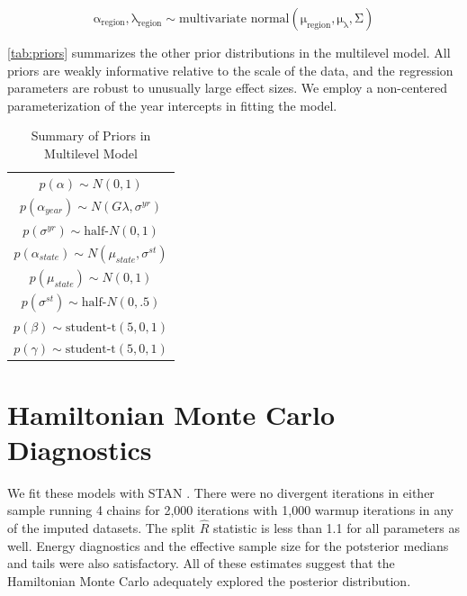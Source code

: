 \documentclass[12pt]{article}
\begin{document}
\begin{equation}
\mathrm{\alpha_{region}, \lambda_{region} \sim \mbox{multivariate normal}(\mu_{region}, \mu_{\lambda}, \Sigma)}
\end{equation}
 

\autoref{tab:priors} summarizes the other prior distributions in the multilevel model. 
All priors are weakly informative relative to the scale of the data, and the regression parameters are robust to unusually large effect sizes. 
We employ a non-centered parameterization of the year intercepts in fitting the model. 



\begin{table} %
\begin{center}
\begin{tabular}{c} 
$ p(\alpha) \sim N(0, 1)$  \\
$ p(\alpha_{year}) \sim N(G \lambda, \sigma^{yr}) $ \\ 
$ p(\sigma^{yr}) \sim \mbox{half-}N(0, 1) $ \\
$ p(\alpha_{state}) \sim N(\mu_{state}, \sigma^{st}) $ \\ 
$ p(\mu_{state}) \sim N(0, 1) $ \\ 
$ p(\sigma^{st}) \sim \mbox{half-}N(0, .5) $ \\ 
$ p(\beta) \sim \mbox{student-t}(5, 0, 1) $ \\
$ p(\gamma) \sim \mbox{student-t}(5, 0, 1) $ 
\end{tabular} 
\caption{Summary of Priors in Multilevel Model} 
\label{tab:priors}
\end{center} 
\end{table} 





\section{Hamiltonian Monte Carlo Diagnostics}

We fit these models with STAN \citep{Carpenteretal2016}.
There were no divergent iterations in either sample running 4 chains for 2,000 iterations with 1,000 warmup iterations in any of the imputed datasets.  
The split $\hat{R}$ statistic is less than 1.1 for all parameters as well.
Energy diagnostics and the effective sample size for the potsterior medians and tails were also satisfactory.  
All of these estimates suggest that the Hamiltonian Monte Carlo adequately explored the posterior distribution. 
\end{document}
